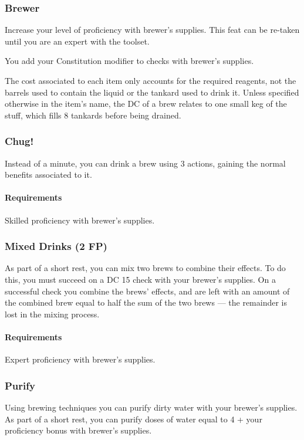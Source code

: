     \subsubsection{Brewer} \label{feat::brewer}
        Increase your level of proficiency with brewer's supplies.
        This feat can be re-taken until you are an expert with the toolset.

        You add your Constitution modifier to checks with brewer's supplies.

        The cost associated to each item only accounts for the required reagents, not the barrels used to contain the liquid or the tankard used to drink it.
        Unless specified otherwise in the item's name, the DC of a brew relates to one small keg of the stuff, which fills 8 tankards before being drained.
    \subsubsection{Chug!} \label{feat::chug}
        Instead of a minute, you can drink a brew using 3 actions, gaining the normal benefits associated to it.
        \paragraph{Requirements} Skilled proficiency with brewer's supplies.
    \subsubsection{Mixed Drinks (2 FP)} \label{feat::mixeddrinks}
        As part of a short rest, you can mix two brews to combine their effects.
        To do this, you must succeed on a DC 15 check with your brewer's supplies.
        On a successful check you combine the brews' effects, and are left with an amount of the combined brew equal to half the sum of the two brews --- the remainder is lost in the mixing process.
        \paragraph{Requirements} Expert proficiency with brewer's supplies.
    \subsubsection{Purify} \label{feat::purify}
        Using brewing techniques you can purify dirty water with your brewer's supplies.
        As part of a short rest, you can purify doses of water equal to 4 + your proficiency bonus with brewer's supplies.
